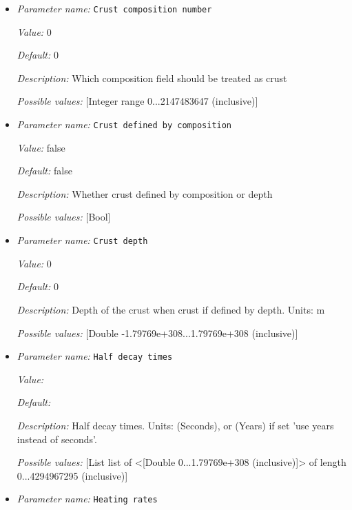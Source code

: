 \begin{itemize}
\item {\it Parameter name:} {\tt Crust composition number}
\label{parameters:Heating model/Radioactive decay/Crust composition number}


{\it Value:} 0


{\it Default:} 0


{\it Description:} Which composition field should be treated as crust


{\it Possible values:} [Integer range 0...2147483647 (inclusive)]
\item {\it Parameter name:} {\tt Crust defined by composition}
\label{parameters:Heating model/Radioactive decay/Crust defined by composition}


{\it Value:} false


{\it Default:} false


{\it Description:} Whether crust defined by composition or depth


{\it Possible values:} [Bool]
\item {\it Parameter name:} {\tt Crust depth}
\label{parameters:Heating model/Radioactive decay/Crust depth}


{\it Value:} 0


{\it Default:} 0


{\it Description:} Depth of the crust when crust if defined by depth. Units: m


{\it Possible values:} [Double -1.79769e+308...1.79769e+308 (inclusive)]
\item {\it Parameter name:} {\tt Half decay times}
\label{parameters:Heating model/Radioactive decay/Half decay times}


{\it Value:} 


{\it Default:} 


{\it Description:} Half decay times. Units: (Seconds), or (Years) if set 'use years instead of seconds'.


{\it Possible values:} [List list of <[Double 0...1.79769e+308 (inclusive)]> of length 0...4294967295 (inclusive)]
\item {\it Parameter name:} {\tt Heating rates}
\label{parameters:Heating model/Radioactive decay/Heating rates}



\end{itemize}
